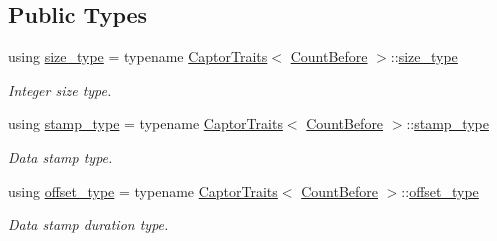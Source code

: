 \subsection*{Public Types}
\begin{DoxyCompactItemize}
\item 
\mbox{\label{classflow_1_1follower_1_1_count_before_a80c833853e8f7f856338a984aeacb993}} 
using \hyperlink{classflow_1_1follower_1_1_count_before_a80c833853e8f7f856338a984aeacb993}{size\+\_\+type} = typename \hyperlink{structflow_1_1_captor_traits}{Captor\+Traits}$<$ \hyperlink{classflow_1_1follower_1_1_count_before}{Count\+Before} $>$\+::\hyperlink{classflow_1_1follower_1_1_count_before_a80c833853e8f7f856338a984aeacb993}{size\+\_\+type}
\begin{DoxyCompactList}\small\item\em Integer size type. \end{DoxyCompactList}\item 
\mbox{\label{classflow_1_1follower_1_1_count_before_a91f304fdc29bfccaa16831ec7675681c}} 
using \hyperlink{classflow_1_1follower_1_1_count_before_a91f304fdc29bfccaa16831ec7675681c}{stamp\+\_\+type} = typename \hyperlink{structflow_1_1_captor_traits}{Captor\+Traits}$<$ \hyperlink{classflow_1_1follower_1_1_count_before}{Count\+Before} $>$\+::\hyperlink{classflow_1_1follower_1_1_count_before_a91f304fdc29bfccaa16831ec7675681c}{stamp\+\_\+type}
\begin{DoxyCompactList}\small\item\em Data stamp type. \end{DoxyCompactList}\item 
\mbox{\label{classflow_1_1follower_1_1_count_before_a235f01dc3187d79c55aaf13d1f819c15}} 
using \hyperlink{classflow_1_1follower_1_1_count_before_a235f01dc3187d79c55aaf13d1f819c15}{offset\+\_\+type} = typename \hyperlink{structflow_1_1_captor_traits}{Captor\+Traits}$<$ \hyperlink{classflow_1_1follower_1_1_count_before}{Count\+Before} $>$\+::\hyperlink{classflow_1_1follower_1_1_count_before_a235f01dc3187d79c55aaf13d1f819c15}{offset\+\_\+type}
\begin{DoxyCompactList}\small\item\em Data stamp duration type. \end{DoxyCompactList}\end{DoxyCompactItemize}
